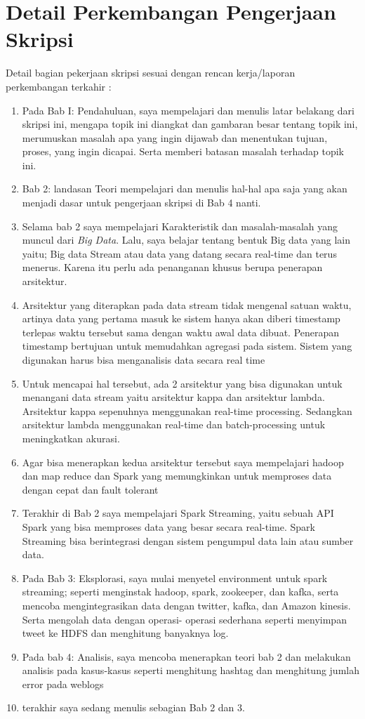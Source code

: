\documentclass[a4paper,twoside]{article}
\begin{document}
\section{Detail Perkembangan Pengerjaan Skripsi}
Detail bagian pekerjaan skripsi sesuai dengan rencan kerja/laporan perkembangan terkahir :
	\begin{enumerate}
		\item{Pada Bab I: Pendahuluan, saya mempelajari dan menulis latar belakang dari skripsi 		ini, mengapa topik ini diangkat dan gambaran besar tentang topik ini, merumuskan 				masalah apa yang ingin dijawab dan menentukan tujuan, proses, yang ingin dicapai. Serta 		memberi batasan masalah terhadap topik ini.}
		\item{Bab 2: landasan Teori mempelajari dan menulis hal-hal apa saja yang akan menjadi 			dasar untuk pengerjaan skripsi di Bab 4 nanti.}
		\item {Selama bab 2 saya mempelajari Karakteristik dan masalah-masalah yang muncul dari 		\textit{Big Data}. Lalu, saya belajar tentang bentuk Big data yang lain yaitu; Big data 		Stream atau data yang datang secara real-time dan terus menerus. Karena itu perlu ada 			penanganan khusus berupa penerapan arsitektur.}
		\item {Arsitektur yang diterapkan pada data stream tidak mengenal satuan waktu, artinya 		data yang pertama masuk ke sistem hanya akan diberi timestamp terlepas waktu tersebut 			sama dengan waktu awal data dibuat. Penerapan timestamp bertujuan untuk memudahkan 				agregasi pada sistem. Sistem yang digunakan harus bisa menganalisis data secara real 			time}
		\item {Untuk mencapai hal tersebut, ada 2 arsitektur yang bisa digunakan untuk 					menangani data stream yaitu arsitektur kappa dan arsitektur lambda. Arsitektur kappa 			sepenuhnya menggunakan real-time processing. Sedangkan arsitektur lambda menggunakan 			real-time dan batch-processing untuk meningkatkan akurasi.}
		\item {Agar bisa menerapkan kedua arsitektur tersebut saya mempelajari hadoop dan map 			reduce dan Spark yang memungkinkan untuk memproses data dengan cepat dan fault 					tolerant}
		\item {Terakhir di Bab 2 saya mempelajari Spark Streaming, yaitu sebuah API Spark yang 			bisa memproses data yang besar secara real-time. Spark Streaming bisa berintegrasi 				dengan sistem pengumpul data lain atau sumber data.}
		\item {Pada Bab 3: Eksplorasi, saya mulai menyetel environment untuk spark streaming; 			seperti menginstak hadoop, spark, zookeeper, dan kafka, serta mencoba mengintegrasikan 			data dengan twitter, kafka, dan Amazon kinesis. Serta mengolah data dengan operasi-				operasi sederhana seperti menyimpan tweet ke HDFS dan menghitung banyaknya log.}
		\item {Pada bab 4: Analisis, saya mencoba menerapkan teori bab 2 dan melakukan analisis 		pada kasus-kasus seperti menghitung hashtag dan menghitung jumlah error pada weblogs}
		\item {terakhir saya sedang menulis sebagian Bab 2 dan 3.} 
	\end{enumerate}
\end{document}
